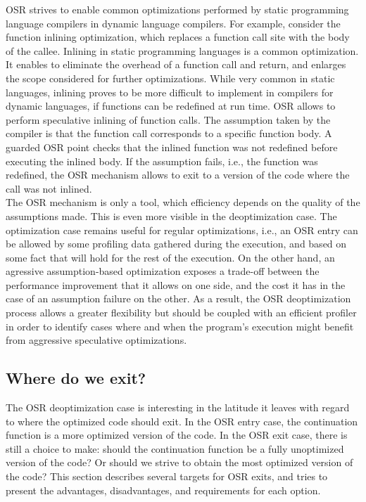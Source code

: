 OSR strives to enable common optimizations performed by static programming language compilers in dynamic language compilers.
For example, consider the function inlining optimization, which replaces a function call site with the body of the callee. 
Inlining in static programming languages is a common optimization.
It enables to eliminate the overhead of a function call and return, and enlarges the scope considered for further optimizations.
While very common in static languages, inlining proves to be more difficult to implement in compilers for dynamic languages, if functions can be redefined at run time.
OSR allows to perform speculative inlining of function calls. 
The assumption taken by the compiler is that the function call corresponds to a specific function body. 
A guarded OSR point checks that the inlined function was not redefined before executing the inlined body.
If the assumption fails, i.e., the function was redefined, the OSR mechanism allows to exit to a version of the code where the call was not inlined.\\

The OSR mechanism is only a tool, which efficiency depends on the quality of the assumptions made.
This is even more visible in the deoptimization case.
The optimization case remains useful for regular optimizations, i.e., an OSR entry can be allowed by some profiling data gathered during the execution, and based on some fact that will hold for the rest of the execution.
On the other hand, an agressive assumption-based optimization exposes a trade-off between the performance improvement that it allows on one side, and the cost it has in the case of an assumption failure on the other.
As a result, the OSR deoptimization process allows a greater flexibility but should be coupled with an efficient profiler in order to identify cases where and when the program's execution might benefit from aggressive speculative optimizations.\\

\subsection{Where do we exit?}
The OSR deoptimization case is interesting in the latitude it leaves with regard to where the optimized code should exit.
In the OSR entry case, the continuation function is a more optimized version of the code.
In the OSR exit case, there is still a choice to make: should the continuation function be a fully unoptimized version of the code? Or should we strive to obtain the most optimized version of the code?
This section describes several targets for OSR exits, and tries to present the advantages, disadvantages, and requirements for each option.\\

